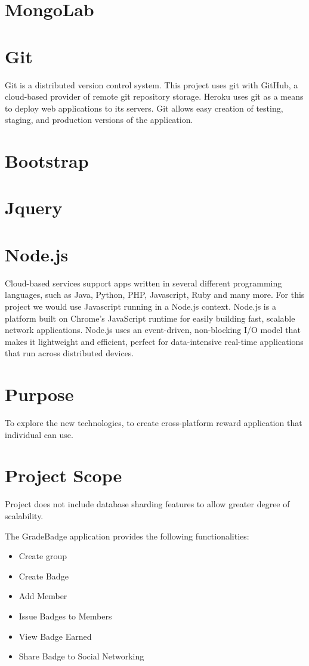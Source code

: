 \section{MongoLab}

\section{Git}
Git is a distributed version control system.  This project uses git with GitHub, a cloud-based provider of remote git repository storage.  Heroku uses git as a means to deploy web applications to its servers. Git allows easy creation of testing, staging, and production versions of the application. 

\section{Bootstrap}


\section{Jquery}

\section{Node.js}
Cloud-based services support apps written in several different programming languages, such as Java, Python, PHP, Javascript, Ruby and many more. For this project we would use Javascript running in a Node.js context. Node.js is a platform built on Chrome's JavaScript runtime for easily building fast, scalable network applications. Node.js uses an event-driven, non-blocking I/O model that makes it lightweight and efficient, perfect for data-intensive real-time applications that run across distributed devices.

\section{Purpose}
To explore the new technologies, to create cross-platform reward application that individual can use.

\section{Project Scope}
Project does not include database sharding features to allow greater degree of scalability. 

The GradeBadge application provides the following functionalities:
\begin{itemize}
\item Create group
\item Create Badge 
\item Add Member
\item Issue Badges to Members
\item View Badge Earned
\item Share Badge to Social Networking 
\end{itemize}


